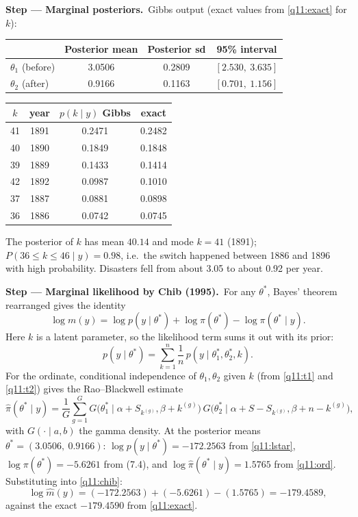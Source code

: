 \documentclass[11pt,a4paper]{article}
\numberwithin{equation}{questao}   %
\newcommand{\passo}[2]{\par\smallskip\noindent\textbf{Step --- #1.}~#2}
\newcommand{\1}{\mathbf{1}}
\begin{document}
\begin{sol}
\passo{Marginal posteriors}{Gibbs output (exact values from \eqref{q11:exact} for $k$):}
\begin{center}\small
\begin{tabular}{lccc}
\toprule
 & Posterior mean & Posterior sd & 95\% interval \\
\midrule
$\theta_1$ (before) & 3.0506 & 0.2809 & $[2.530,\ 3.635]$\\
$\theta_2$ (after)  & 0.9166 & 0.1163 & $[0.701,\ 1.156]$\\
\bottomrule
\end{tabular}
\qquad
\begin{tabular}{cccc}
\toprule
$k$ & year & $p(k\mid y)$ Gibbs & exact \\
\midrule
41 & 1891 & 0.2471 & 0.2482\\
40 & 1890 & 0.1849 & 0.1848\\
39 & 1889 & 0.1433 & 0.1414\\
42 & 1892 & 0.0987 & 0.1010\\
37 & 1887 & 0.0881 & 0.0898\\
36 & 1886 & 0.0742 & 0.0745\\
\bottomrule
\end{tabular}
\end{center}
The posterior of $k$ has mean $40.14$ and mode $k=41$ (1891); $P(36\le k\le46\mid y)=0.98$, i.e.\ the
switch happened between 1886 and 1896 with high probability. Disasters fell from about 3.05 to
about 0.92 per year.

\passo{Marginal likelihood by Chib (1995)}{For any $\theta^*$, Bayes' theorem rearranged gives the
identity}
\begin{equation}\label{q11:chib}
\log m(y)=\log p(y\mid\theta^*)+\log\pi(\theta^*)-\log\pi(\theta^*\mid y).
\end{equation}
Here $k$ is a latent parameter, so the likelihood term sums it out with its prior:
\begin{equation}\label{q11:lstar}
p(y\mid\theta^*)=\sum_{k=1}^n\frac1n\,p(y\mid\theta_1^*,\theta_2^*,k).
\end{equation}
For the ordinate, conditional independence of $\theta_1,\theta_2$ given $k$ (from \eqref{q11:t1} and
\eqref{q11:t2}) gives the Rao--Blackwell estimate
\begin{equation}\label{q11:ord}
\hat\pi(\theta^*\mid y)=\frac1G\sum_{g=1}^G G\big(\theta_1^*\mid\alpha+S_{k^{(g)}},\beta+k^{(g)}\big)\,
G\big(\theta_2^*\mid\alpha+S-S_{k^{(g)}},\beta+n-k^{(g)}\big),
\end{equation}
with $G(\cdot\mid a,b)$ the gamma density. At the posterior means $\theta^*=(3.0506,\ 0.9166)$:
$\log p(y\mid\theta^*)=-172.2563$ from \eqref{q11:lstar}, $\log\pi(\theta^*)=-5.6261$ from (7.4), and
$\log\hat\pi(\theta^*\mid y)=1.5765$ from \eqref{q11:ord}. Substituting into \eqref{q11:chib}:
\[
\log\hat m(y)=(-172.2563)+(-5.6261)-(1.5765)=-179.4589 ,
\]
against the exact $-179.4590$ from \eqref{q11:exact}.


\end{sol}
\end{document}
